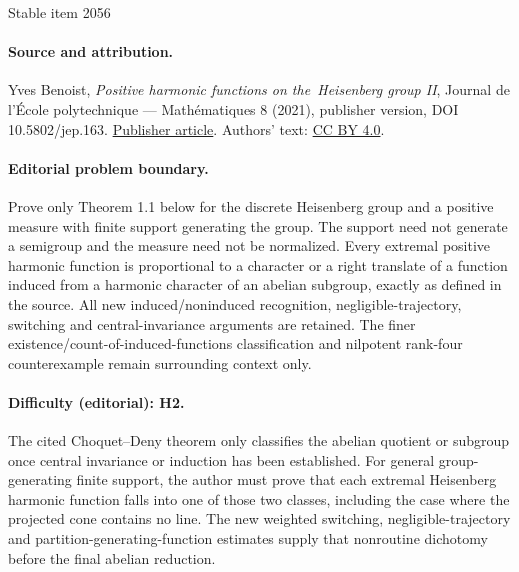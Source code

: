 \documentclass[11pt]{article}
\numberwithin{equation}{section}
\begin{document}
\begin{center}{\Large Stable item 2056}\end{center}
\paragraph{Source and attribution.}
Yves Benoist, \emph{Positive harmonic functions on the Heisenberg group II}, Journal de l’École polytechnique — Mathématiques 8 (2021), publisher version, DOI 10.5802/jep.163. \href{https://jep.centre-mersenne.org/articles/10.5802/jep.163/}{Publisher article}. Authors' text: \href{https://creativecommons.org/licenses/by/4.0/}{CC BY 4.0}.
\paragraph{Editorial problem boundary.}
Prove only Theorem 1.1 below for the discrete Heisenberg group and a positive measure with finite support generating the group. The support need not generate a semigroup and the measure need not be normalized. Every extremal positive harmonic function is proportional to a character or a right translate of a function induced from a harmonic character of an abelian subgroup, exactly as defined in the source. All new induced/noninduced recognition, negligible-trajectory, switching and central-invariance arguments are retained. The finer existence/count-of-induced-functions classification and nilpotent rank-four counterexample remain surrounding context only.
\paragraph{Difficulty (editorial): H2.}
The cited Choquet--Deny theorem only classifies the abelian quotient or subgroup once central invariance or induction has been established. For general group-generating finite support, the author must prove that each extremal Heisenberg harmonic function falls into one of those two classes, including the case where the projected cone contains no line. The new weighted switching, negligible-trajectory and partition-generating-function estimates supply that nonroutine dichotomy before the final abelian reduction.
\end{document}
